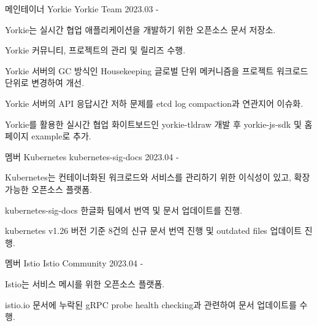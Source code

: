 

\begin{cventries}

  \cventry
    {메인테이너} %
    {Yorkie} %
    {Yorkie Team} %
    {2023.03 - } %
    {
      \begin{cvitems} %
        \item {Yorkie는 실시간 협업 애플리케이션을 개발하기 위한 오픈소스 문서 저장소.}
        \item {Yorkie 커뮤니티, 프로젝트의 관리 및 릴리즈 수행.}
        \item {Yorkie 서버의 GC 방식인 Housekeeping 글로벌 단위 메커니즘을 프로젝트 워크로드 단위로 변경하여 개선.}
        \item {Yorkie 서버의 API 응답시간 저하 문제를 etcd log compaction과 연관지어 이슈화.}
        \item {Yorkie를 활용한 실시간 협업 화이트보드인 yorkie-tldraw 개발 후 yorkie-js-sdk 및 홈페이지 example로 추가.}
      \end{cvitems}
    }

  \cventry
  {멤버} %
  {Kubernetes} %
  {kubernetes-sig-docs} %
  {2023.04 - } %
  {
    \begin{cvitems} %
      \item {Kubernetes는 컨테이너화된 워크로드와 서비스를 관리하기 위한 이식성이 있고, 확장 가능한 오픈소스 플랫폼.}
      \item {kubernetes-sig-docs 한글화 팀에서 번역 및 문서 업데이트를 진행.}
      \item {kubernetes v1.26 버전 기준 8건의 신규 문서 번역 진행 및 outdated files 업데이트 진행.}
    \end{cvitems}
  }

  \cventry
    {멤버} %
    {Istio} %
    {Istio Community} %
    {2023.04 - } %
    {
      \begin{cvitems} %
        \item {Istio는 서비스 메시를 위한 오픈소스 플랫폼.}
        \item {istio.io 문서에 누락된 gRPC probe health checking과 관련하여 문서 업데이트를 수행.}
      \end{cvitems}
    }


\end{cventries}

